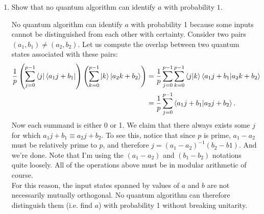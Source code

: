 \documentclass{article}
\theoremstyle{definition}
\newcommand{\f}[2]{\frac{#1}{#2}}
\newcommand{\lp}{\left(}
\newcommand{\rp}{\right)}
\begin{document}
\begin{enumerate}[label=(\alph*)]
\item Show that no quantum algorithm can identify $a$ with probability $1$.

\noindent No quantum algorithm can identify $a$ with probability 1 because some inputs cannot be distinguished from each other with certainty. Consider two pairs $(a_1, b_1) \neq (a_2, b_2)$. Let us compute the overlap between two quantum states associated with these pairs:
\begin{align*}
	\f{1}{p}\lp \sum_{j=0}^{p-1} \bra{j} \bra{a_1 j + b_1}  \rp \lp \sum_{k=0}^{p-1} \ket{k} \ket{a_2 k + b_2}  \rp 
	&= \f{1}{p} \sum_{j=0}^{p-1} \sum_{k=0}^{p-1} \bra{j}\ket{k} \bra{a_1 j + b_1} \ket{a_2 k + b_2} \\
	&= \f{1}{p} \sum_{j=0}^{p-1}  \bra{a_1 j + b_1} \ket{a_2 j + b_2}.
\end{align*}
Now each summand is either 0 or 1. We claim that there always exists some $j$ for which $a_1 j + b_1 \equiv a_2 j + b_2$. To see this, notice that since $p$ is prime, $a_1 - a_2$ must be relatively prime to $p$, and therefore $j = (a_1 - a_2)^{-1} (b_2-b1)$. And we're done. Note that I'm using the $(a_1 -a_2)$ and $(b_1 - b_2)$ notations quite loosely. All of the operations above must be in modular arithmetic of course.  \\

For this reason, the input states spanned by values of $a$ and $b$ are not necessarily mutually orthogonal. No quantum algorithm can therefore distinguish them (i.e. find $a$) with probability 1 without breaking unitarity.  


\end{enumerate}
\end{document}
